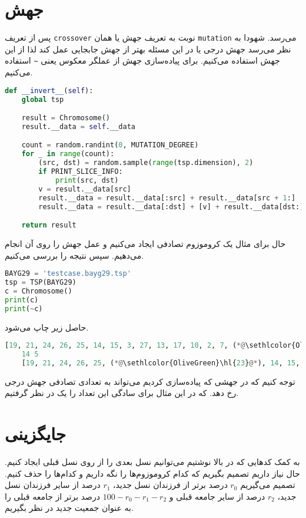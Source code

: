 \documentclass[a4paper, 12pt]{article}
\theoremstyle{definition}
\begin{document}
\section{جهش}
پس از تعریف
\texttt{crossover}
نوبت به تعریف جهش یا همان
\texttt{mutation}
می‌رسد. شهودا به نظر می‌رسد جهش درجی یا
در این مسئله بهتر از جهش جابجایی عمل کند لذا از این جهش استفاده می‌کنیم. برای پیاده‌سازی جهش از عملگر معکوس یعنی
\texttt{\textasciitilde}
استفاده می‌کنیم.

\LTR
\begin{lstlisting}[language=Python]
def __invert__(self):
    global tsp

    result = Chromosome()
    result.__data = self.__data

    count = random.randint(0, MUTATION_DEGREE)
    for _ in range(count):
        (src, dst) = random.sample(range(tsp.dimension), 2)
        if PRINT_SLICE_INFO:
            print(src, dst)
        v = result.__data[src]
        result.__data = result.__data[:src] + result.__data[src + 1:]
        result.__data = result.__data[:dst] + [v] + result.__data[dst:]

    return result
\end{lstlisting}
\RTL

حال برای مثال یک کروموزوم تصادفی ایجاد می‌کنیم و عمل جهش را روی آن انجام می‌دهیم. سپس نتیجه را بررسی می‌کنیم.

\LTR
\begin{lstlisting}[language=Python]
BAYG29 = 'testcase.bayg29.tsp'
tsp = TSP(BAYG29)
c = Chromosome()
print(c)
print(~c)    
\end{lstlisting}
\RTL
حاصل زیر چاپ می‌شود.

\LTR
\begin{lstlisting}[language=Python]
    [19, 21, 24, 26, 25, 14, 15, 3, 27, 13, 17, 10, 2, 7, (*@\sethlcolor{OliveGreen}\hl{23}@*), 9, 4, 22, 0, 8, 6, 16, 12, 28, 11, 20, 5, 18, 1]: 4649
    14 5
    [19, 21, 24, 26, 25, (*@\sethlcolor{OliveGreen}\hl{23}@*), 14, 15, 3, 27, 13, 17, 10, 2, 7, 9, 4, 22, 0, 8, 6, 16, 12, 28, 11, 20, 5, 18, 1]: 4738  
\end{lstlisting}
\RTL

توجه کنیم که در جهشی که پیاده‌سازی کردیم می‌تواند به تعدادی تصادفی جهش درجی رخ دهد. که در این مثال برای سادگی این تعداد را یک در نظر گرفتیم.

\section{جایگزینی}
به کمک کدهایی که در بالا نوشتیم می‌توانیم نسل بعدی را از روی نسل قبلی ایجاد کنیم. حال نیاز داریم تصمیم بگیریم که کدام کروموزوم‌ها را نگه داریم و کدام‌ها را حذف کنیم. تصمیم می‌گیریم
$r_0$
درصد برتر از فرزندان نسل جدید،
$r_1$
درصد از سایر فرزندان نسل جدید،
$r_2$
درصد از سایر جامعه قبلی و
$100 - r_0 - r_1 - r_2$
درصد برتر از جامعه قبلی را به عنوان جمعیت جدید در نظر بگیریم.
\end{document}
